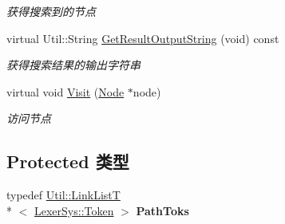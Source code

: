 \begin{DoxyCompactItemize}
\begin{DoxyCompactList}\small\item\em 获得搜索到的节点 \end{DoxyCompactList}\item 
\hypertarget{class_file_sys_1_1_node_visitor_a75c0566ce6177629732cc0fc8d500c59}{virtual Util\-::\-String \hyperlink{class_file_sys_1_1_node_visitor_a75c0566ce6177629732cc0fc8d500c59}{Get\-Result\-Output\-String} (void) const }\label{class_file_sys_1_1_node_visitor_a75c0566ce6177629732cc0fc8d500c59}

\begin{DoxyCompactList}\small\item\em 获得搜索结果的输出字符串 \end{DoxyCompactList}\item 
virtual void \hyperlink{class_file_sys_1_1_node_visitor_a3398560bc10e71a0b8fcaac57e5b58e2}{Visit} (\hyperlink{class_file_sys_1_1_node}{Node} $\ast$node)
\begin{DoxyCompactList}\small\item\em 访问节点 \end{DoxyCompactList}\end{DoxyCompactItemize}
\subsection*{Protected 类型}
\begin{DoxyCompactItemize}
\item 
\hypertarget{class_file_sys_1_1_node_visitor_aa0480a8d4c26e612bb11e8f1c7da929e}{typedef \hyperlink{class_util_1_1_link_list_t}{Util\-::\-Link\-List\-T}\\*
$<$ \hyperlink{class_lexer_sys_1_1_token}{Lexer\-Sys\-::\-Token} $>$ {\bfseries Path\-Toks}}\label{class_file_sys_1_1_node_visitor_aa0480a8d4c26e612bb11e8f1c7da929e}

\end{DoxyCompactItemize}
